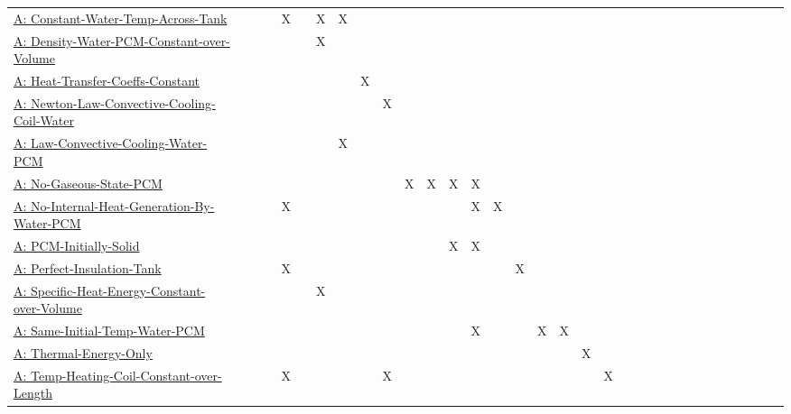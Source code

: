 \documentclass[12pt]{article}
\begin{document}
\begin{longtable}{l l l l l l l l l l l l l l l l l l l l l l l l l l l l l l l l l}
\\
\hyperref[assumpCWTAT]{A: Constant-Water-Temp-Across-Tank} &  &  &  & X &  & X & X &  &  &  &  &  &  &  &  &  &  &  &  &  &  &  &  &  &  &  &  &  &  &  &  & 
\\
\hyperref[assumpDWPCoV]{A: Density-Water-PCM-Constant-over-Volume} &  &  &  &  &  & X &  &  &  &  &  &  &  &  &  &  &  &  &  &  &  &  &  &  &  &  &  &  &  &  &  & 
\\
\hyperref[assumpHTCC]{A: Heat-Transfer-Coeffs-Constant} &  &  &  &  &  &  &  & X &  &  &  &  &  &  &  &  &  &  &  &  &  &  &  &  &  &  &  &  &  &  &  & 
\\
\hyperref[assumpLCCCW]{A: Newton-Law-Convective-Cooling-Coil-Water} &  &  &  &  &  &  &  &  & X &  &  &  &  &  &  &  &  &  &  &  &  &  &  &  &  &  &  &  &  &  &  & 
\\
\hyperref[assumpLCCWP]{A: Law-Convective-Cooling-Water-PCM} &  &  &  &  &  &  & X &  &  &  &  &  &  &  &  &  &  &  &  &  &  &  &  &  &  &  &  &  &  &  &  & 
\\
\hyperref[assumpNGSP]{A: No-Gaseous-State-PCM} &  &  &  &  &  &  &  &  &  & X & X & X & X &  &  &  &  &  &  &  &  &  &  &  &  &  &  &  &  &  &  & 
\\
\hyperref[assumpNIHGBWP]{A: No-Internal-Heat-Generation-By-Water-PCM} &  &  &  & X &  &  &  &  &  &  &  &  & X & X &  &  &  &  &  &  &  &  &  &  &  &  &  &  &  &  &  & 
\\
\hyperref[assumpPIS]{A: PCM-Initially-Solid} &  &  &  &  &  &  &  &  &  &  &  & X & X &  &  &  &  &  &  &  &  &  &  &  &  &  &  &  &  &  &  & 
\\
\hyperref[assumpPIT]{A: Perfect-Insulation-Tank} &  &  &  & X &  &  &  &  &  &  &  &  &  &  & X &  &  &  &  &  &  &  &  &  &  &  &  &  &  &  &  & 
\\
\hyperref[assumpSHECov]{A: Specific-Heat-Energy-Constant-over-Volume} &  &  &  &  &  & X &  &  &  &  &  &  &  &  &  &  &  &  &  &  &  &  &  &  &  &  &  &  &  &  &  & 
\\
\hyperref[assumpSITWP]{A: Same-Initial-Temp-Water-PCM} &  &  &  &  &  &  &  &  &  &  &  &  & X &  &  & X & X &  &  &  &  &  &  &  &  &  &  &  &  &  &  & 
\\
\hyperref[assumpTEO]{A: Thermal-Energy-Only} &  &  &  &  &  &  &  &  &  &  &  &  &  &  &  &  &  & X &  &  &  &  &  &  &  &  &  &  &  &  &  & 
\\
\hyperref[assumpTHCCoL]{A: Temp-Heating-Coil-Constant-over-Length} &  &  &  & X &  &  &  &  & X &  &  &  &  &  &  &  &  &  & X &  &  &  &  &  &  &  &  &  &  &  &  & 
\\

\end{longtable}
\end{document}
